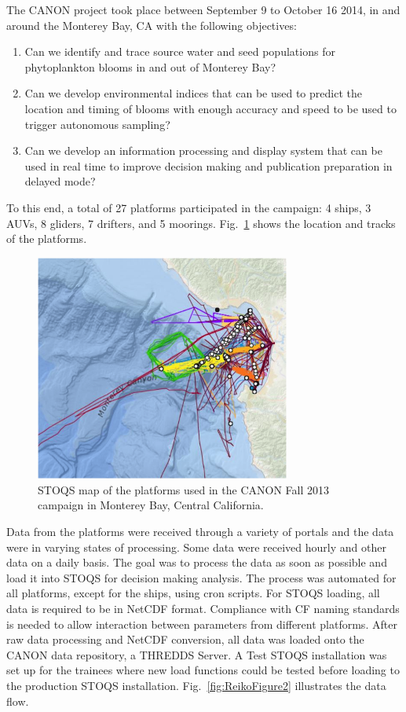 The CANON project took place between September 9 to October 16 2014, in and around the Monterey Bay, CA with the following objectives: 
\begin{enumerate}
\item Can we identify and trace source water and seed populations for phytoplankton blooms in and out of Monterey Bay?
\item Can we develop environmental indices that can be used to predict the location and timing of blooms with enough accuracy and speed to be used to trigger autonomous sampling?
\item Can we develop an information processing and display system that can be used in real time to improve decision making and publication preparation in delayed mode?
\end{enumerate}

To this end, a total of 27 platforms participated in the campaign: 4 ships, 3 AUVs, 8 gliders, 7 drifters, and 5 moorings.  Fig.~\ref{fig:ReikoFigure1} shows the location and tracks of the platforms.

\begin{figure}[htbp]
\centering
\includegraphics[width=3.3in]{ReikoFigure1.png}
\caption{STOQS map of the platforms used in the CANON Fall 2013 campaign in Monterey Bay, Central California.}
\label{fig:ReikoFigure1}
\end{figure}

Data from the platforms were received through a variety of portals and the data were in varying states of processing.  Some data were received hourly and other data on a daily basis.  The goal was to process the data as soon as possible and load it into STOQS for decision making analysis.  The process was automated for all platforms, except for the ships, using cron scripts.  For STOQS loading, all data is required to be in NetCDF format.  Compliance with CF naming standards is needed to allow interaction between parameters from different platforms.  After raw data processing and NetCDF conversion, all data was loaded onto the CANON data repository, a THREDDS Server.  A Test STOQS installation was set up for the trainees where new load functions could be tested before loading to the production STOQS installation.   Fig.~\ref{fig:ReikoFigure2} illustrates the data flow.


